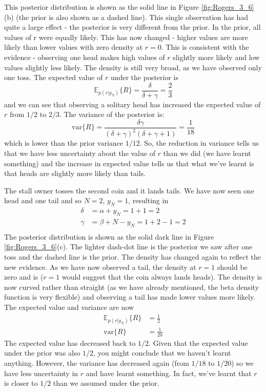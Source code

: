 This posterior distribution is shown as the solid line in Figure \ref{fig:Rogers_3_6}(b)
(the prior is also shown as a dashed line). This single observation has had quite a large effect -
the posterior is very different from the prior. In the prior, all values of r were equally
likely. This has now changed - higher values are more likely than lower values with
zero density at $r = 0$. This is consistent with the evidence - observing one head
makes high values of $r$ slightly more likely and low values slightly less likely. The
density is still very broad, as we have observed only one toss. The expected value of
$r$ under the posterior is
\begin{equation*}
\mathbb{E}_{p(r|y_N)} \{ R \} = \frac{\delta}{\delta + \gamma} = \frac{2}{3}
\end{equation*}
and we can see that observing a solitary head has increased the expected value of $r$
from $1/2$ to $2/3$. The variance of the posterior is:
\begin{equation*}
\mathrm{var}\{R\} = \frac{\delta \gamma}{(\delta + \gamma)^2 (\delta + \gamma + 1)} = \frac{1}{18}
\end{equation*}
which is lower than the prior variance $1/12$. So, the reduction in variance tells
us that we have less uncertainty about the value of $r$ than we did (we have learnt
something) and the increase in expected value tells us that what we've learnt is that
heads are slightly more likely than tails.

The stall owner tosses the second coin and it lands tails. We have now seen one
head and one tail and so $N=2$, $y_N =1$, resulting in
\begin{align*}
\delta & = \alpha + y_N    = 1 + 1 = 2 \\
\gamma & = \beta + N - y_N = 1 + 2 - 1 = 2 \\
\end{align*}
%
The posterior distribution is shown as the solid dark line in Figure \ref{fig:Rogers_3_6}(c).
The lighter dash-dot line is the posterior we saw after one toss and the dashed line is the
prior. The density has changed again to reflect the new evidence. As we have now
observed a tail, the density at $r = 1$ should be zero and is ($r = 1$ would suggest that
the coin always lands heads). The density is now curved rather than straight (as we
have already mentioned, the beta density function is very flexible) and observing a
tail has made lower values more likely. The expected value and variance are now
\begin{align*}
\mathbb{E}_{p(r|y_N)} \{ R \} & = \frac{1}{2} \\
\mathrm{var}\{R\} & = \frac{1}{20}
\end{align*}
The expected value has decreased back to $1/2$. Given that the expected value under
the prior was also $1/2$, you might conclude that we haven't learnt anything. However,
the variance has decreased again (from $1/18$ to $1/20$) so we have less uncertainty in
$r$ and have learnt something. In fact, we've learnt that $r$ is closer to $1/2$ than we
assumed under the prior.

